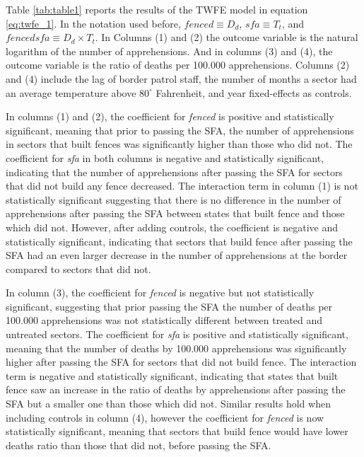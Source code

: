\documentclass[titlepage]{article}
\theoremstyle{plain}
\theoremstyle{plain}
\begin{document}




Table \ref{tab:table1} reports the results of the TWFE model in equation \ref{eq:twfe_1}. In the notation used before, $\textit{fenced} \equiv D_{d}$, $\textit{sfa} \equiv T_{t}$, and $\textit{fencedsfa} \equiv D_{d} \times T_{t}$. In Columns (1) and (2) the outcome variable is the natural logarithm of the number of apprehensions. And in columns (3) and (4), the outcome variable is the ratio of deaths per 100.000 apprehensions. Columns (2) and (4) include the lag of border patrol staff, the number of months a sector had an average temperature above $80^{\circ}$ Fahrenheit, and year fixed-effects as controls.

In columns (1) and (2), the coefficient for \textit{fenced} is positive and statistically significant, meaning that prior to passing the SFA, the number of apprehensions in sectors that built fences was significantly higher than those who did not. The coefficient for \textit{sfa} in both columns is negative and statistically significant, indicating that the number of apprehensions after passing the SFA for sectors that did not build any fence decreased. The interaction term in column (1) is not statistically significant suggesting that there is no difference in the number of apprehensions after passing the SFA between states that built fence and those which did not. However, after adding controls, the coefficient is negative and statistically significant, indicating that sectors that build fence after passing the SFA had an even larger decrease in the number of apprehensions at the border compared to sectors that did not.

In column (3), the coefficient for \textit{fenced} is negative but not statistically significant, suggesting that prior passing the SFA the number of deaths per 100.000 apprehensions was not statistically different between treated and untreated sectors. The coefficient for \textit{sfa} is positive and statistically significant, meaning that the number of deaths by 100.000 apprehensions was significantly higher after passing the SFA for sectors that did not build fence. The interaction term is negative and statistically significant, indicating that states that built fence saw an increase in the ratio of deaths by apprehensions after passing the SFA but a smaller one than those which did not. Similar results hold when including controls in column (4), however the coefficient for \textit{fenced} is now statistically significant, meaning that sectors that build fence would have lower deaths ratio than those that did not, before passing the SFA.
\end{document}
